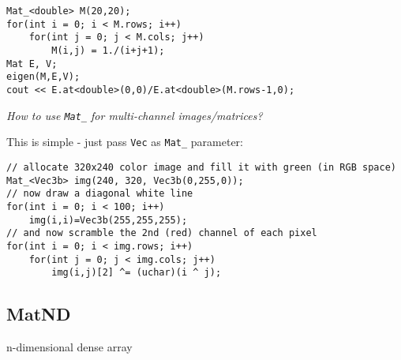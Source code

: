 \begin{lstlisting}
Mat_<double> M(20,20);
for(int i = 0; i < M.rows; i++)
    for(int j = 0; j < M.cols; j++)
        M(i,j) = 1./(i+j+1);
Mat E, V;
eigen(M,E,V);
cout << E.at<double>(0,0)/E.at<double>(M.rows-1,0);
\end{lstlisting}

\emph{How to use \texttt{Mat\_} for multi-channel images/matrices?}

This is simple - just pass \texttt{Vec} as \texttt{Mat\_} parameter:
\begin{lstlisting}
// allocate 320x240 color image and fill it with green (in RGB space)
Mat_<Vec3b> img(240, 320, Vec3b(0,255,0));
// now draw a diagonal white line
for(int i = 0; i < 100; i++)
    img(i,i)=Vec3b(255,255,255);
// and now scramble the 2nd (red) channel of each pixel
for(int i = 0; i < img.rows; i++)
    for(int j = 0; j < img.cols; j++)
        img(i,j)[2] ^= (uchar)(i ^ j);
\end{lstlisting}

\subsection{MatND}\label{MatND}
n-dimensional dense array

